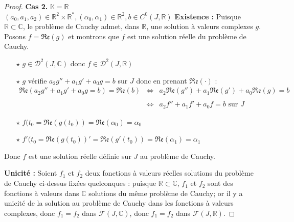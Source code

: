 \documentclass{article}
\begin{document}
\begin{proof}
\textbf{Cas 2. } $\mathbb{K} = \mathbb{R}$ \\
$(a_{0}, a_{1}, a_{2}) \in \mathbb{R}^{2} \times \mathbb{R}^{*},(\alpha_{0}, \alpha_{1}) \in \mathbb{R}^{2}, b \in C^{0}(J, \mathbb{R})$ 
\newline
\textbf{Existence :} Puisque $\mathbb{R} \subset \mathbb{C}$, le problème de Cauchy admet, dans $\mathbb{R}$, une solution à valeurs complexes $g$. Posons $f = \mathfrak{Re}(g)$ et montrons que $f$ est une solution réelle du problème de Cauchy. \\
\begin{itemize}
    \item[$\star$] $g \in \mathcal{D}^{2}(J, \mathbb{C}) \text{ donc } f \in \mathcal{D}^{2}(J, \mathbb{R})$
    \item[$\star$] $g$ vérifie $a_{2}g'' + a_{1}g' + a_{0}g = b$ sur $J$ donc en prenant $\mathfrak{Re}(\cdot)$ : 
    $$\begin{array}{ccl}
      \mathfrak{Re}(a_{2}g'' + a_{1}g' + a_{0}g = b) = \mathfrak{Re}(b)   
      &\iff &a_{2}\mathfrak{Re}(g'') + a_{1}\mathfrak{Re}(g') + a_{0}\mathfrak{Re}(g) = b  \\\\
      &\iff & a_{2}f'' + a_{1}f' + a_{0}f = b \text{ sur } J
    \end{array}$$
    \item[$\star$] $f(t_{0} = \mathfrak{Re}(g(t_{0})) = \mathfrak{Re}(\alpha_{0}) = \alpha_{0}$
    \item[$\star$] $f'(t_{0} = \mathfrak{Re}(g(t_{0}))' = \mathfrak{Re}(g'(t_{0})) = \mathfrak{Re}(\alpha_{1}) = \alpha_{1}$
\end{itemize}
Donc $f$ est une solution réelle définie sur $J$ au problème de Cauchy. 
\newline

\textbf{Unicité : }Soient $f_{1}$ et $f_{2}$ deux fonctions à valeurs réelles solutions du problème de Cauchy ci-dessus fixées quelconques : puisque $\mathbb{R} \subset \mathbb{C}$, $f_{1}$ et $f_{2}$ sont des fonctions à valeurs dans $\mathbb{C}$ solutions du même problème de Cauchy; or il y a unicité de la solution au problème de Cauchy dans les fonctions à valeurs complexes, donc $f_{1} = f_{2}$ dans $\mathcal{F}(J, \mathbb{C})$, donc $f_{1} = f_{2}$ dans $\mathcal{F}(J, \mathbb{R})$.
\end{proof}
\end{document}
